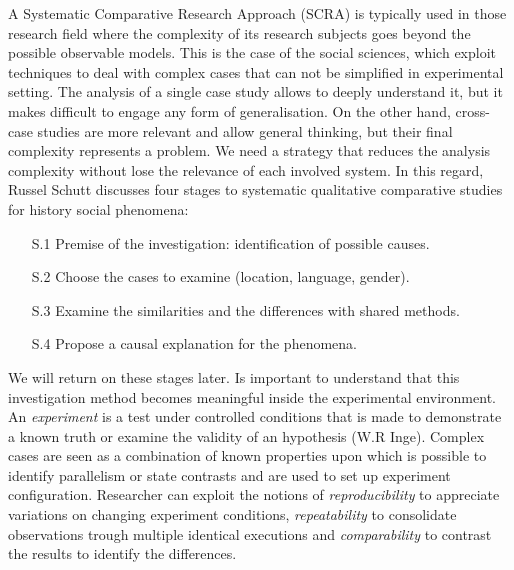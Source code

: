 A Systematic Comparative Research Approach (SCRA) is typically used in those research field where the complexity of its research subjects goes beyond the possible observable models. This is the case of the social sciences, which exploit techniques to deal with complex cases that can not be simplified in experimental setting. The analysis of a single case study allows to deeply understand it, but it makes difficult to engage any form of generalisation. On the other hand, cross-case studies are more relevant and allow general thinking, but their final complexity represents a problem. We need a strategy that reduces the analysis complexity without lose the relevance of each involved system. In this regard, Russel Schutt discusses four stages to systematic qualitative comparative studies for history social phenomena:
\begin{enumerate}
\item[S.1] Premise of the investigation: identification of possible causes.
\item[S.2] Choose the cases to examine (location, language, gender).
\item[S.3] Examine the similarities and the differences with shared methods.
\item[S.4] Propose a causal explanation for the phenomena.
\end{enumerate} We will return on these stages later. Is important to understand that this investigation method becomes meaningful inside the experimental environment. An \textit{experiment} is a test under controlled conditions that is made to demonstrate a known truth or examine the validity of an hypothesis (W.R Inge). Complex cases are seen as a combination of known properties upon which is possible to identify parallelism or state contrasts and are used to set up experiment configuration. Researcher can exploit the notions of \textit{reproducibility} to appreciate variations on changing experiment conditions, \textit{repeatability} to consolidate observations trough multiple identical executions and \textit{comparability} to contrast the results to identify the differences.

